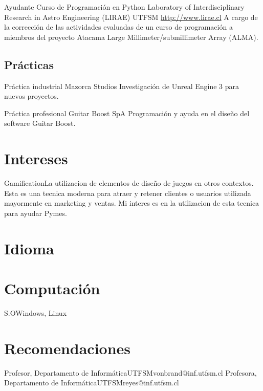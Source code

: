 \documentclass[a4paper,10pt]{moderncv}
\begin{document}
        {Ayudante Curso de Programación en Python}
        {Laboratory of Interdisciplinary Research in Astro Engineering (LIRAE)}
        {UTFSM}
        {\url{http://www.lirae.cl}}
        {A cargo de la corrección de las actividades evaluadas de un curso
        de programación a miembros del proyecto Atacama Large Millimeter/submillimeter
        Array (ALMA).}

\subsection{Prácticas}

        {Práctica industrial}
        {Mazorca Studios}
        {}
        {}
        {Investigación de Unreal Engine 3 para nuevos proyectos.}%

        {Práctica profesional}
        {Guitar Boost SpA}
        {}
        {}
        {Programación y ayuda en el diseño del software Guitar Boost.}%

\section{Intereses}
           {Gamification}{La utilizacion de elementos de diseño de juegos en otros 
	   contextos. Esta es una tecnica moderna para atraer y retener clientes 
           o usuarios utilizada mayormente en marketing y ventas. Mi interes es en
           la utilizacion de esta tecnica para ayudar Pymes.}

\section{Idioma}

\section{Computaci\'on}
 {S.O}{Windows, Linux}

\section{Recomendaciones}
        {Profesor, Departamento de Informática}{UTFSM}{vonbrand@inf.utfsm.cl}{}
        {Profesora, Departamento de Informática}{UTFSM}{reyes@inf.utfsm.cl}{}
\end{document}

